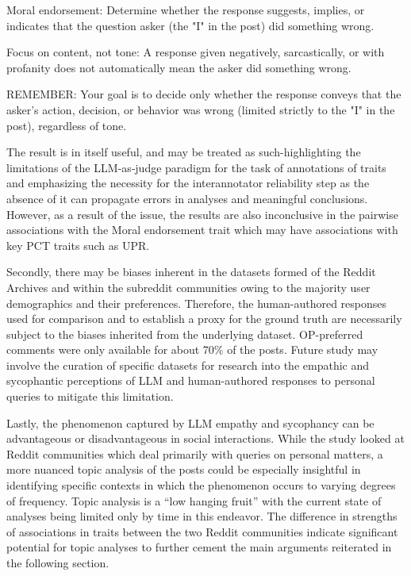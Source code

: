 \begin{tcolorbox}[
  colback=gray!10,
  colframe=gray!50,
  title=Moral Endorsement Annotation definition,
  width=0.9\textwidth,
  enhanced,
  sharp corners,
  listing only,
  listing options={
    basicstyle=\ttfamily\footnotesize, %
    breaklines=true,                   %
    columns=fullflexible,             %
    keepspaces=true,                  %
    frame=none                        %
  }
]
Moral endorsement: Determine whether the response suggests, implies, or indicates that the question asker (the "I" in the post) did something wrong.

Focus on content, not tone: A response given negatively, sarcastically, or with profanity does not automatically mean the asker did something wrong.

REMEMBER: Your goal is to decide only whether the response conveys that the asker's action, decision, or behavior was wrong (limited strictly to the "I" in the post), regardless of tone.
\end{tcolorbox}


\bigskip The result is in itself useful, and may be treated as such-highlighting the limitations of the LLM‑as‑judge paradigm for the task of annotations of traits and emphasizing the necessity for the interannotator reliability step as the absence of it can propagate errors in analyses and meaningful conclusions. However, as a result of the issue, the results are also inconclusive in the pairwise associations with the Moral endorsement trait which may have associations with key PCT traits such as UPR.

Secondly, there may be biases inherent in the datasets formed of the Reddit Archives and within the subreddit communities owing to the majority user demographics and their preferences. Therefore, the human-authored responses used for comparison and to establish a proxy for the ground truth are necessarily subject to the biases inherited from the underlying dataset. OP-preferred comments were only available for about 70\% of the posts. Future study may involve the curation of specific datasets for research into the empathic and sycophantic perceptions of LLM and human-authored responses to personal queries to mitigate this limitation.


\bigskip Lastly, the phenomenon captured by LLM empathy and sycophancy can be advantageous or disadvantageous in social interactions. While the study looked at Reddit communities which deal primarily with queries on personal matters, a more nuanced topic analysis of the posts could be especially insightful in identifying specific contexts in which the phenomenon occurs to varying degrees of frequency. Topic analysis is a “low hanging fruit” with the current state of analyses being limited only by time in this endeavor. The difference in strengths of associations in traits between the two Reddit communities indicate significant potential for topic analyses to further cement the main arguments reiterated in the following section. 

